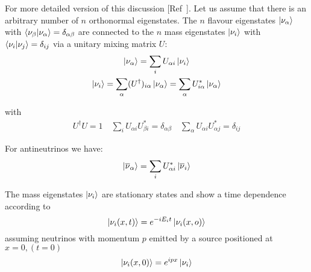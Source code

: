 For more detailed version of this discussion [Ref~]. Let us assume that there is an arbitrary number of \(n\) orthonormal eigenstates.
The \(n\) flavour eigenstates \(\ket{\nu_\alpha}\) with   \(\bra{\nu_\beta}\ket{\nu_\alpha} = \delta _{\alpha\beta}\) are connected to the \(n\) mass eigenstates \(\ket{\nu_i}\) with \(\bra{\nu_i}\ket{\nu_j} = \delta _{ij}\) via a unitary mixing matrix \(U\):
\begin{gather}
    \ket{\nu _\alpha} = \sum _{i} U_{\alpha i} \ket{\nu _i} \\
    \ket{\nu _i} = \sum _{\alpha} (U^\dagger) _{i \alpha } \ket{\nu _\alpha} = \sum _{\alpha} U^* _{i \alpha } \ket{\nu _\alpha}
\end{gather}

with 
\begin{gather}
    U^\dagger U = 1 \quad \sum_{i} U_{\alpha i} U^* _{\beta i} = \delta _{\alpha\beta}\quad\sum_{\alpha} U_{\alpha i} U^* _{\alpha j} = \delta _{ij}
\end{gather}

For antineutrinos we have:
\begin{equation}
    \ket{\overline {\nu} _\alpha} = \sum _{i} U^* _{\alpha i} \ket{\overline {\nu} _i}
\end{equation}

The mass eigenstates \(\ket{\nu _i}\) are stationary states and show a time dependence according to 
\begin{equation}
    \ket{\nu _i (x, t)} = e^{-i E_i t} \ket{\nu _i (x, o)}
\end{equation}
assuming neutrinos with momentum \(p\) emitted by a source positioned at \(x = 0,(t = 0)\)
\begin{equation}
    \ket{\nu _i (x, 0)} = e^{ip x} \ket{\nu _i}
\end{equation}

